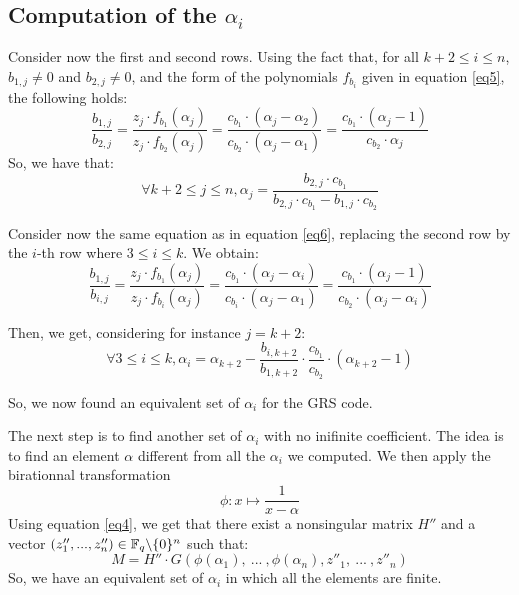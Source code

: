 \documentclass[a4paper]{article}
\begin{document}
\subsection{Computation of the $\alpha_i$}
Consider now the first and second rows. Using the fact that, for all $k+2\leq i\leq n$, $b_{1,j}\neq 0$ and $b_{2,j}\neq 0$, and the form of the polynomials $f_{b_i}$ given in equation \eqref{eq5}, the following holds:
\begin{equation}
\frac{b_{1,j}}{b_{2,j}} = \frac{z_j\cdot f_{b_1}(\alpha_j)}{z_j\cdot f_{b_2}(\alpha_j)} = \frac{c_{b_1}\cdot (\alpha_j - \alpha_2)}{c_{b_2}\cdot (\alpha_j - \alpha_1)} = \frac{c_{b_1}\cdot (\alpha_j - 1)}{c_{b_2}\cdot \alpha_j}
\label{eq6}
\end{equation}
So, we have that:
\begin{equation}
\forall k+2\leq j\leq n, \alpha_j = \frac{b_{2,j}\cdot c_{b_1}}{b_{2,j}\cdot c_{b_1} - b_{1,j}\cdot c_{b_2}}
\label{eq7}
\end{equation}

Consider now the same equation as in equation \eqref{eq6}, replacing the second row by the $i$-th row where $3\leq i\leq k$. We obtain:
\begin{equation}
\frac{b_{1,j}}{b_{i,j}} = \frac{z_j\cdot f_{b_1}(\alpha_j)}{z_j\cdot f_{b_i}(\alpha_j)} = \frac{c_{b_1}\cdot (\alpha_j - \alpha_i)}{c_{b_i}\cdot (\alpha_j - \alpha_1)} = \frac{c_{b_1}\cdot (\alpha_j - 1)}{c_{b_2}\cdot (\alpha_j - \alpha_i)}
\label{eq8}
\end{equation}

Then, we get, considering for instance $j=k+2$:
\begin{equation}
\forall 3\leq i\leq k, \alpha_i = \alpha_{k+2} - \frac{b_{i,k+2}}{b_{1,k+2}}\cdot \frac{c_{b_1}}{c_{b_2}}\cdot (\alpha_{k+2}-1)
\label{eq9}
\end{equation}

So, we now found an equivalent set of $\alpha_i$ for the GRS code.

The next step is to find another set of $\alpha_i$ with no inifinite coefficient. The idea is to find an element $\alpha$ different from all the $\alpha_i$ we computed.
We then apply the birationnal transformation
$$ \phi : x \mapsto \frac{1}{x - \alpha}$$
Using equation \eqref{eq4}, we get that there exist a nonsingular matrix $H''$ and a vector $(z''_1,... ,z''_n) \in \mathbb{F}_q\backslash\{0\}^{n}$ such that:
$$M = H''\cdot G(\phi(\alpha_1), \ ... \ , \phi(\alpha_n), z''_1, \ ... \ , z''_n)$$
So, we have an equivalent set of $\alpha_i$ in which all the elements are finite.
\end{document}
